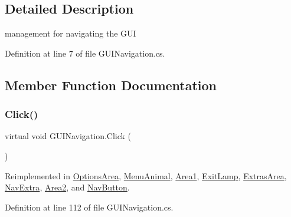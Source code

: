 \subsection{Detailed Description}
management for navigating the G\+UI 



Definition at line 7 of file G\+U\+I\+Navigation.\+cs.



\subsection{Member Function Documentation}
\mbox{\label{class_g_u_i_navigation_a175178a8bf2832e74c13f83bf8e8f714}} 
\subsubsection{\texorpdfstring{Click()}{Click()}}
{\footnotesize\ttfamily virtual void G\+U\+I\+Navigation.\+Click (\begin{DoxyParamCaption}{ }\end{DoxyParamCaption})\hspace{0.3cm}{\ttfamily [virtual]}}



Reimplemented in \mbox{\hyperlink{class_options_area_a1ee78382652a273de4911c8a2894ee36}{Options\+Area}}, \mbox{\hyperlink{class_menu_animal_abb7cd3e0be5e041e4d5df6b44c94b7e4}{Menu\+Animal}}, \mbox{\hyperlink{class_area1_abe3e9544cd582f84468323ec7d254d32}{Area1}}, \mbox{\hyperlink{class_exit_lamp_ae9f16c3c4507fc9eecb5fc4b0e225a6b}{Exit\+Lamp}}, \mbox{\hyperlink{class_extras_area_a7bb3d45f3aa655ba946eab4b0c7f38f4}{Extras\+Area}}, \mbox{\hyperlink{class_nav_extra_aa4325eb5cc7289d582ffda1a617dd093}{Nav\+Extra}}, \mbox{\hyperlink{class_area2_aeee901daa00ed32828b4979c5546cad5}{Area2}}, and \mbox{\hyperlink{class_nav_button_ac574ba6c7acafe3ccd18b2c62b8c261d}{Nav\+Button}}.



Definition at line 112 of file G\+U\+I\+Navigation.\+cs.

\mbox{\label{class_g_u_i_navigation_a98563f06446b45814ff78978b472e948}} 
